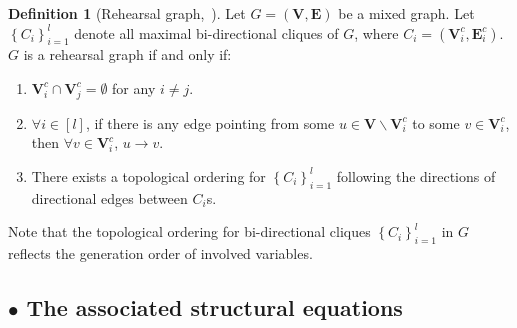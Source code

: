 \documentclass{article}
\theoremstyle{plain}
\theoremstyle{definition}
\newtheorem{definition}[theorem]{Definition}
\def \V {\mathbf{V}}
\def \E {\mathbf{E}}
\def \V {\mathbf{V}}
\def \V {\mathbf{V}}
\begin{document}
\begin{definition}[Rehearsal graph,~\cite{qint2023srm}]
  \label{def:rh_graph}
  Let $G=(\V, \E)$ be a mixed graph. Let $\left\{C_i\right\}_{i=1}^l$ denote all maximal bi-directional cliques of $G$, where $C_i=\left(\V_i^c, \E_i^c\right)$. $G$ is a rehearsal graph if and only if:
  \vspace{-0.3\baselineskip}
  \begin{enumerate}
    \item $\V_i^c \cap \V_j^c=\emptyset$ for any $i \neq j$.
    \vspace{0.2\baselineskip}
    \item $\forall i \in[l]$, if there is any edge pointing from some $u \in \V \backslash \V_i^c$ to some $v \in \V_i^c$, then $\forall v \in \V_i^c$, $u \rightarrow v$.
    \vspace{0.2\baselineskip}
    \item There exists a topological ordering for $\left\{C_i\right\}_{i=1}^l$ following the directions of directional edges between $C_i$s.
  \end{enumerate}
\end{definition}

Note that the topological ordering for bi-directional cliques $\left\{C_i\right\}_{i=1}^l$ in $G$ reflects the generation order of involved variables. 


\subsection*{$\bullet$ The associated structural equations}
\end{document}
